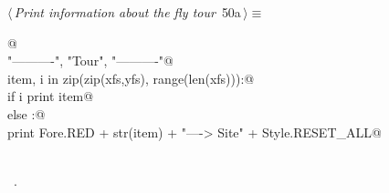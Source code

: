\documentclass[11.5pt]{report}
\begin{document}
\vspace{-0.8cm} \newchunk
\begin{flushleft} \small\label{scrap78}\raggedright\small
{} $\langle\,${\itshape Print information about the fly tour}\nobreak\ {\footnotesize {50a}}$\,\rangle\equiv$
\vspace{-1ex}
\begin{list}{}{} \item
\mbox{}\verb@   @\\
\mbox{}\verb@print "\n----------", "\nFly Tour", "\n----------"@\\
\mbox{}\verb@for item, i in zip(zip(xfs,yfs), range(len(xfs))):@\\
\mbox{}\verb@   if i%2 == 0:@\\
\mbox{}\verb@       print item@\\
\mbox{}\verb@   else :@\\
\mbox{}\verb@       print Fore.RED + str(item) + "----> Site" +  Style.RESET_ALL@\\
\mbox{}\verb@@\\
\mbox{}\verb@@{\NWsep}
\end{list}
\vspace{-1.5ex}
\footnotesize
\begin{list}{}{\setlength{\itemsep}{-\parsep}\setlength{\itemindent}{-\leftmargin}}
\item \NWtxtMacroRefIn\ .

\item{}
\end{list}
\vspace{4ex}
\end{flushleft}
\end{document}
